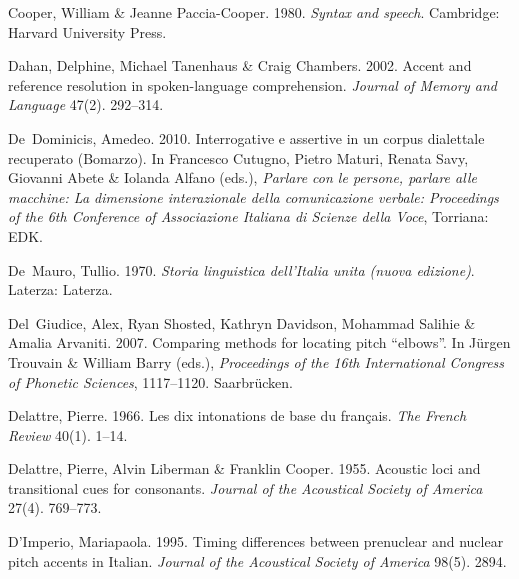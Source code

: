 \documentclass[ number=1
,series=labphon
,output=long
,url=http://langsci-press.org/catalog/book/16
,isbn=978-3-944675-01-5
]{LSP/langsci}
\begin{document}
\begin{thebibliography}{284}
Cooper, William \& Jeanne Paccia-Cooper. 1980.
\newblock \emph{Syntax and speech}.
\newblock Cambridge: Harvard University Press.

Dahan, Delphine, Michael Tanenhaus \& Craig Chambers. 2002.
\newblock Accent and reference resolution in spoken-language comprehension.
\newblock \emph{Journal of Memory and Language} 47(2). 292--314.

De~Dominicis, Amedeo. 2010.
\newblock Interrogative e assertive in un corpus dialettale recuperato
  ({B}omarzo).
\newblock In Francesco Cutugno, Pietro Maturi, Renata Savy, Giovanni Abete \&
  Iolanda Alfano (eds.), \emph{Parlare con le persone, parlare alle macchine:
  {L}a dimensione interazionale della comunicazione verbale: {P}roceedings of
  the 6th {C}onference of {A}ssociazione {I}taliana di {S}cienze della {V}oce},
  Torriana: EDK.


\enlargethispage{2\baselineskip}
De~Mauro, Tullio. 1970.
\newblock \emph{Storia linguistica dell'{I}talia unita (nuova edizione)}.
\newblock Laterza: Laterza.

Del~Giudice, Alex, Ryan Shosted, Kathryn Davidson, Mohammad Salihie \& Amalia
  Arvaniti. 2007.
\newblock Comparing methods for locating pitch ``elbows''.
\newblock In Jürgen Trouvain \& William Barry (eds.), \emph{Proceedings of the
  16th {I}nternational {C}ongress of {P}honetic {S}ciences}, 1117--1120.
  Saarbr\"{u}cken.

Delattre, Pierre. 1966.
\newblock Les dix intonations de base du fran\c{c}ais.
\newblock \emph{The French Review} 40(1). 1--14.

Delattre, Pierre, Alvin Liberman \& Franklin Cooper. 1955.
\newblock Acoustic loci and transitional cues for consonants.
\newblock \emph{Journal of the Acoustical Society of America} 27(4). 769--773.

D'Imperio, Mariapaola. 1995.
\newblock Timing differences between prenuclear and nuclear pitch accents in
  {I}talian.
\newblock \emph{Journal of the Acoustical Society of America} 98(5). 2894.


\end{thebibliography}
\end{document}
